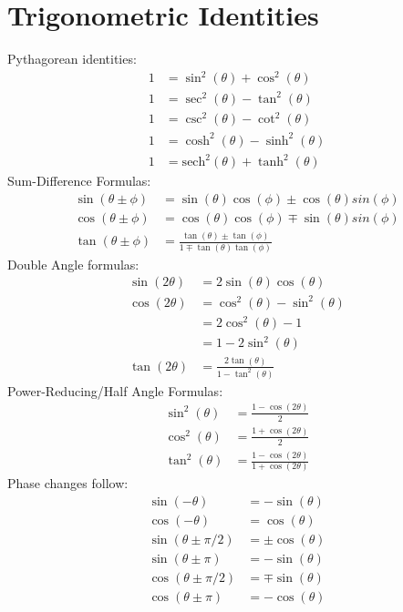\section{Trigonometric Identities}
\begin{multicols}{2}
Pythagorean identities:
\begin{align}
1 &= \sin^2(\theta)+\cos^2(\theta)\\
1 &= \sec^2(\theta)-\tan^2(\theta) \\
1 &= \csc^2(\theta)-\cot^2(\theta) \\
1 &= \cosh^2(\theta)-\sinh^2(\theta) \\
1 &= \textrm{sech}^2(\theta)+\tanh^2(\theta)
\end{align}
Sum-Difference Formulas:
\begin{align}
\sin(\theta \pm \phi) &= \sin(\theta)\cos(\phi)\pm \cos(\theta)sin(\phi) \\
\cos(\theta \pm \phi) &= \cos(\theta)\cos(\phi)\mp \sin(\theta)sin(\phi) \\
\tan(\theta \pm \phi) &= \frac{\tan(\theta)\pm \tan (\phi)}{1 \mp \tan(\theta)\tan(\phi)}
\end{align}
Double Angle formulas:
\begin{align}
\sin(2\theta) &= 2\sin(\theta)\cos(\theta) \\
\cos(2\theta) &= \cos^2(\theta)-\sin^2(\theta)\\
&= 2\cos^2(\theta)-1 \\
&= 1 - 2\sin^2(\theta) \\
\tan(2\theta) &= \frac{2 \tan(\theta)}{1-\tan^2(\theta)}
\end{align}
Power-Reducing/Half Angle Formulas:
\begin{align}
\sin^2(\theta) &= \frac{1-\cos(2\theta)}{2}\\
\cos^2(\theta) &= \frac{1+\cos(2\theta)}{2}\\
\tan^2(\theta) &= \frac{1-\cos(2\theta)}{1+\cos(2\theta)}
\end{align}
Phase changes follow:
\begin{align}
\sin(-\theta) &=-\sin(\theta) \\
\cos(-\theta) &= \cos(\theta) \\
\sin(\theta\pm \pi/2) &= \pm \cos(\theta) \\
\sin(\theta\pm \pi) &= - \sin(\theta) \\
\cos(\theta\pm \pi/2) &= \mp \sin(\theta) \\
\cos(\theta\pm \pi) &= - \cos(\theta) 

\end{align}
\end{multicols}
